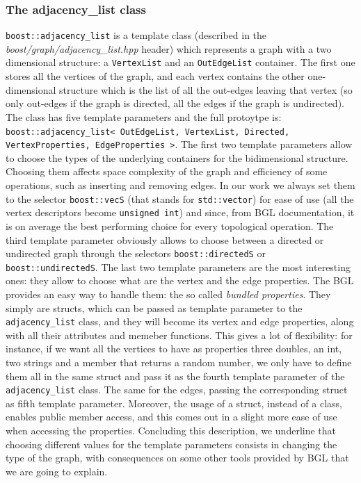 \documentclass[10pt]{article} %
\newcommand{\classname}[1]{\texttt{#1}}
\begin{document}
	\subsubsection{The adjacency\_list class}
	\classname{boost::adjacency\_list} is a template class (described in the \textit{boost/graph/adjacency\_list.hpp} header) which represents a graph with a two dimensional structure: a \texttt{VertexList} and an \texttt{OutEdgeList} container. The first one stores all the vertices of the graph, and each vertex contains the other one-dimensional structure which is the list of all the out-edges leaving that vertex (so only out-edges if the graph is directed, all the edges if the graph is undirected). \newline
	The class has five template parameters and the full protoytpe is: \classname{boost::adjacency\_list< OutEdgeList, VertexList, Directed, VertexProperties, EdgeProperties >}. \newline
	The first two template parameters allow to choose the types of the underlying containers for the bidimensional structure. Choosing them affects space complexity of the graph and efficiency of some operations, such as inserting and removing edges. In our work we always set them to the selector \classname{boost::vecS} (that stands for \texttt{std::vector}) for ease of use (all the vertex descriptors become \texttt{unsigned int}) and since, from BGL documentation, it is on average the best performing choice for every topological operation. \newline
	The third template parameter obviously allows to choose between a directed or undirected graph through the selectors \texttt{boost::directedS} or \texttt{boost::undirectedS}.\newline
	The last two template parameters are the most interesting ones: they allow to choose what are the vertex and the edge properties. The BGL provides an easy way to handle them: the so called \textit{bundled properties}. They simply are structs, which can be passed as template parameter to the \classname{adjacency\_list} class, and they will become its vertex and edge properties, along with all their attributes and memeber functions. This gives a lot of flexibility: for instance, if we want all the vertices to have as properties three doubles, an int, two strings and a member that returns a random number, we only have to define them all in the same struct and pass it as the fourth template parameter of the \classname{adjacency\_list} class. The same for the edges, passing the corresponding struct as fifth template parameter. Moreover, the usage of a struct, instead of a class, enables public member access, and this comes out in a slight more ease of use when accessing the properties. \newline
	Concluding this description, we underline that choosing different values for the template parameters consists in changing the type of the graph, with consequences on some other tools provided by BGL that we are going to explain.
	
\end{document}
